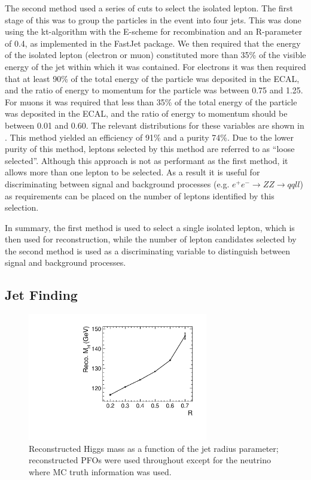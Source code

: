 The second method used a series of cuts to select the isolated lepton. The first stage of this was to group the particles in the event into four jets. This was done using the kt-algorithm with the E-scheme for recombination and an R-parameter of 0.4, as implemented in the FastJet package\cite{Cacciari:2011ma}. We then required that the energy of the isolated lepton (electron or muon) constituted more than 35\% of the visible energy of the jet within which it was contained. For electrons it was then required that at least 90\% of the total energy of the particle was deposited in the ECAL, and the ratio of energy to momentum for the particle was between 0.75 and 1.25. For muons it was required that less than 35\% of the total energy of the particle was deposited in the ECAL, and the ratio of energy to momentum should be between 0.01 and 0.60. The relevant distributions for these variables are shown in . This method yielded an efficiency of 91\% and a purity 74\%. Due to the lower purity of this method, leptons selected by this method are referred to as ``loose selected''. Although this approach is not as performant as the first method, it allows more than one lepton to be selected. As a result it is useful for discriminating between signal and background processes (e.g. $e^+e^-\rightarrow ZZ\rightarrow qqll$) as requirements can be placed on the number of leptons identified by this selection.

In summary, the first method is used to select a single isolated lepton, which is then used for reconstruction, while the number of lepton candidates selected by the second method is used as a discriminating variable to distinguish between signal and background processes. 

\subsection{Jet Finding}
\label{higgsjetfinding}

\begin{figure}
  \centering
  \includegraphics[width=0.7\textwidth,keepaspectratio]{HiggsAnalysis/figures/HiggsJetOptimization.pdf}
  \caption[Jet Reconstruction Optimization]{Reconstructed Higgs mass as a function of the jet radius parameter; reconstructed PFOs were used throughout except for the neutrino where MC truth information was used.}
  \label{fig:jetoptimization}
\end{figure}

